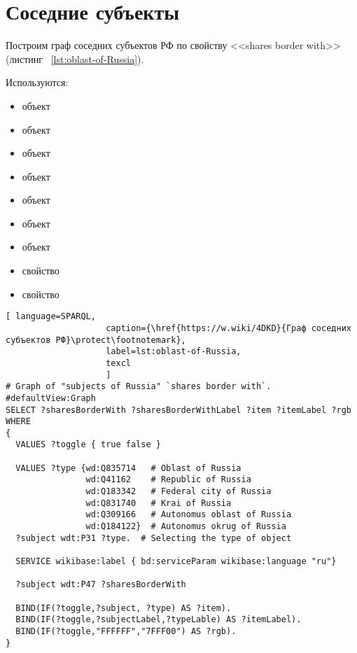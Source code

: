 \section{Соседние субъекты}

Построим граф соседних субъектов РФ по свойству <<shares border with>> (листинг ~\protect\ref{lst:oblast-of-Russia}).

Используются:
\begin{itemize}
  \item объект 
  \item объект 
  \item объект 
  \item объект 
  \item объект 
  \item объект 
  \item объект 
  \item свойство 
  \item свойство 
\end{itemize}

\begin{lstlisting}[ language=SPARQL, 
                    caption={\href{https://w.wiki/4DKD}{Граф соседних субъектов РФ}\protect\footnotemark},
                    label=lst:oblast-of-Russia,
                    texcl 
                    ]
# Graph of "subjects of Russia" `shares border with`. 
#defaultView:Graph
SELECT ?sharesBorderWith ?sharesBorderWithLabel ?item ?itemLabel ?rgb
WHERE
{
  VALUES ?toggle { true false }
  
  VALUES ?type {wd:Q835714   # Oblast of Russia
                wd:Q41162    # Republic of Russia
                wd:Q183342   # Federal city of Russia
                wd:Q831740   # Krai of Russia
                wd:Q309166   # Autonomus oblast of Russia
                wd:Q184122}  # Autonomus okrug of Russia
  ?subject wdt:P31 ?type.  # Selecting the type of object  
  
  SERVICE wikibase:label { bd:serviceParam wikibase:language "ru"}
  
  ?subject wdt:P47 ?sharesBorderWith   
           
  BIND(IF(?toggle,?subject, ?type) AS ?item).
  BIND(IF(?toggle,?subjectLabel,?typeLable) AS ?itemLabel).
  BIND(IF(?toggle,"FFFFFF","7FFF00") AS ?rgb).
}
\end{lstlisting}%

